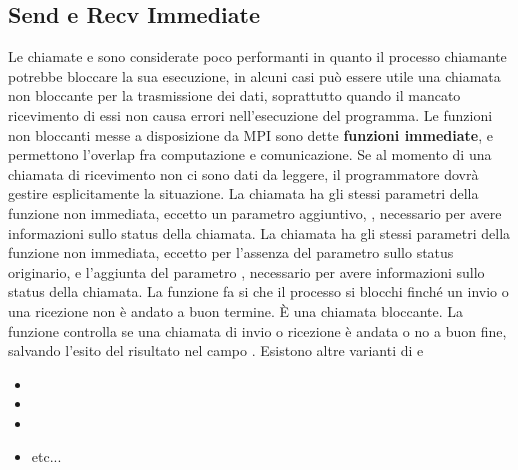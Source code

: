 \documentclass[10pt, letterpaper]{report}
\begin{document}
\subsection{Send e Recv Immediate}
Le chiamate  e  sono considerate poco performanti in quanto il processo chiamante 
potrebbe bloccare la sua esecuzione, in alcuni casi può essere utile una chiamata non bloccante per la trasmissione 
dei dati, soprattutto quando il mancato ricevimento di essi non causa errori nell'esecuzione del programma. Le funzioni non 
bloccanti messe a disposizione da MPI sono dette \textbf{funzioni immediate}, e permettono l'overlap fra 
computazione e comunicazione. Se al momento di una chiamata di ricevimento non ci sono dati da leggere, il programmatore 
dovrà gestire esplicitamente la situazione.\acc 
La chiamata  ha gli stessi parametri della funzione non immediata, eccetto un parametro aggiuntivo, 
, necessario per avere informazioni sullo status della chiamata.\acc 
La chiamata  ha gli stessi parametri della funzione non immediata, eccetto per l'assenza del 
parametro sullo status originario, e l'aggiunta del parametro 
, necessario per avere informazioni sullo status della chiamata.\acc 
La funzione  fa si che il processo si blocchi 
finché un invio o una ricezione non è andato a buon termine. È una chiamata bloccante.\acc 
La funzione  controlla se una 
chiamata di invio o ricezione è andata o no a buon fine, salvando l'esito del risultato nel campo .\acc 
Esistono altre varianti di  e  \begin{itemize}
    \item {} 
    \item {} 
    \item {}
    \item etc...
\end{itemize}
\end{document}
